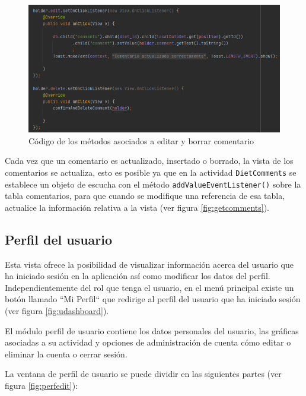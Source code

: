 \begin{figure}[H]
    \centering
    \includegraphics[width=\textwidth]{Images/Capitulo7/editdelete.png}
    \caption{Código de los métodos asociados a editar y borrar comentario}
    \label{fig:editdelete}
\end{figure}

Cada vez que un comentario es actualizado, insertado o borrado, la vista de los comentarios se actualiza, esto es posible ya que en la actividad \texttt{DietComments} se establece un objeto de escucha con el método \texttt{addValueEventListener()} sobre la tabla comentarios, para que cuando se modifique una referencia de esa tabla, actualice la información relativa a la vista (ver figura \ref{fig:getcomments}).

\subsection{Perfil del usuario}
Esta vista ofrece la posibilidad de visualizar información acerca del usuario que ha iniciado sesión en la aplicación así como modificar los datos del perfil. 
Independientemente del rol que tenga el usuario, en el menú principal existe un botón llamado ``Mi Perfil`` que redirige al perfil del usuario que ha iniciado sesión (ver figura \ref{fig:udashboard}).

El módulo perfil de usuario contiene los datos personales del usuario, las gráficas asociadas a su actividad y opciones de administración de cuenta cómo editar o eliminar la cuenta o cerrar sesión.

La ventana de perfil de usuario se puede dividir en las siguientes partes (ver figura \ref{fig:perfedit}):


